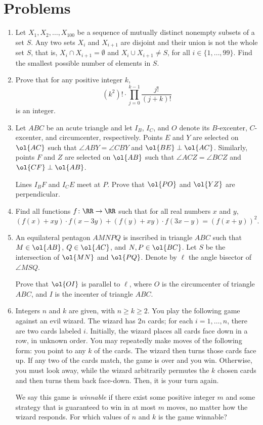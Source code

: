 \documentclass[11pt]{scrartcl}
\begin{document}
\section{Problems}
\begin{enumerate}[\bfseries 1.]
\item %
Let $X_1, X_2, \dots, X_{100}$ be a sequence of mutually distinct nonempty subsets of a set $S$.
Any two sets $X_i$ and $X_{i+1}$ are disjoint and their
union is not the whole set $S$,
that is, $X_i\cap X_{i+1}=\emptyset$ and $X_i\cup X_{i+1}\neq S$,
for all $i\in\{1, \dots, 99\}$.
Find the smallest possible number of elements in $S$.

\item %
Prove that for any positive integer $k$,
\[ (k^2)!\cdot\displaystyle\prod_{j=0}^{k-1}\frac{j!}{(j+k)!} \]
is an integer.

\item %
Let $ABC$ be an acute triangle
and let $I_B$, $I_C$, and $O$ denote its
$B$-excenter, $C$-excenter, and circumcenter, respectively.
Points $E$ and $Y$ are selected on $\ol{AC}$ such that
$\angle ABY = \angle CBY$ and $\ol{BE} \perp \ol{AC}$.
Similarly, points $F$ and $Z$ are selected on $\ol{AB}$ such that
$\angle ACZ = \angle BCZ$ and $\ol{CF} \perp \ol{AB}$.

Lines $I_B F$ and $I_C E$ meet at $P$.
Prove that $\ol{PO}$ and $\ol{YZ}$ are perpendicular.

\item %
Find all functions $f \colon \RR \to \RR$ such that
for all real numbers $x$ and $y$,
\[ (f(x)+xy) \cdot f(x-3y)
 + (f(y)+xy) \cdot f(3x-y)
 = (f(x+y))^2. \]

\item %
An equilateral pentagon $AMNPQ$ is inscribed in triangle $ABC$
such that $M \in \ol{AB}$, $Q \in \ol {AC}$, and $N,P \in \ol{BC}$.
Let $S$ be the intersection of $\ol{MN}$ and $\ol{PQ}$.
Denote by $\ell$ the angle bisector of $\angle MSQ$.

Prove that $\ol{OI}$ is parallel to $\ell$,
where $O$ is the circumcenter of triangle $ABC$,
and $I$ is the incenter of triangle $ABC$.

\item %
Integers $n$ and $k$ are given, with $n \ge k \ge 2$.
You play the following game against an evil wizard.
The wizard has $2n$ cards; for each $i=1,\dots,n$, there are two cards labeled $i$.
Initially, the wizard places all cards face down in a row, in unknown order.
You may repeatedly make moves of the following form: you point to any $k$ of the cards.
The wizard then turns those cards face up.
If any two of the cards match, the game is over and you win.
Otherwise, you must look away, while the wizard arbitrarily permutes
the $k$ chosen cards and then turns them back face-down. Then, it is your turn again.

We say this game is \emph{winnable} if there exist some positive integer $m$ and
some strategy that is guaranteed to win in at most $m$ moves,
no matter how the wizard responds.
For which values of $n$ and $k$ is the game winnable?

\end{enumerate}
\pagebreak
\end{document}
